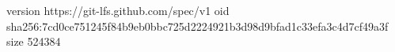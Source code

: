 version https://git-lfs.github.com/spec/v1
oid sha256:7cd0ce751245f84b9eb0bbc725d2224921b3d98d9bfad1c33efa3c4d7cf49a3f
size 524384
